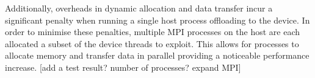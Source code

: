 \documentclass[runningheads,a4paper]{llncs}
\begin{document}

Additionally, overheads in dynamic allocation and data transfer incur a significant penalty when running a single host process 
offloading to the device. In order to minimise these penalties, multiple MPI processes on the host are each allocated 
a subset of the device threads to exploit. This allows for processes to allocate memory and transfer data in parallel 
providing a noticeable performance increase. [add a test result? number of processes? expand MPI]




\end{document}
